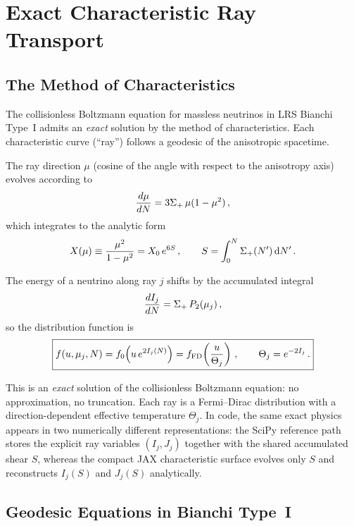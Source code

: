 \section{Exact Characteristic Ray Transport}\label{sec:characteristic}

\subsection{The Method of Characteristics}

The collisionless Boltzmann equation for massless neutrinos in LRS Bianchi Type~I admits an \emph{exact} solution by the method of characteristics.  Each characteristic curve (``ray'') follows a geodesic of the anisotropic spacetime.

The ray direction $\mu$ (cosine of the angle with respect to the anisotropy axis) evolves according to
\begin{equation}
\frac{d\mu}{dN} = 3\Sigma_+\,\mu(1 - \mu^2)\,,
\end{equation}
which integrates to the analytic form
\begin{equation}
X(\mu) \equiv \frac{\mu^2}{1 - \mu^2} = X_0\,e^{6S}\,,\qquad S = \int_0^N \Sigma_+(N')\,\mathrm{d} N'\,.\label{eq:X_evolution}
\end{equation}

The energy of a neutrino along ray $j$ shifts by the accumulated integral
\begin{equation}
\frac{dI_j}{dN} = \Sigma_+\,P_2(\mu_j)\,,\label{eq:dI}
\end{equation}
so the distribution function is
\begin{equation}
\boxed{f(u, \mu_j, N) = f_0\!\left(u\,e^{2I_j(N)}\right) = f_{\rm FD}\!\left(\frac{u}{\Theta_j}\right)\,,\qquad \Theta_j = e^{-2I_j}\,.}\label{eq:char_sol}
\end{equation}

This is an \emph{exact} solution of the collisionless Boltzmann equation: no approximation, no truncation.  Each ray is a Fermi--Dirac distribution with a direction-dependent effective temperature $\Theta_j$.  In code, the same exact physics appears in two numerically different representations: the SciPy reference path stores the explicit ray variables $(I_j, J_j)$ together with the shared accumulated shear $S$, whereas the compact JAX characteristic surface evolves only $S$ and reconstructs $I_j(S)$ and $J_j(S)$ analytically.

\subsection{Geodesic Equations in Bianchi Type~I}

